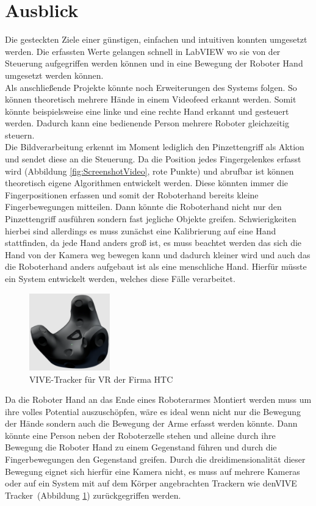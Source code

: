\documentclass[a4paper,12pt,final]{article} %
\numberwithin{equation}{section} %
\numberwithin{figure}{section} %
\numberwithin{table}{section} %
\begin{document}
\section{Ausblick}
Die gesteckten Ziele einer günstigen, einfachen und intuitiven konnten umgesetzt werden. 
Die erfassten Werte gelangen schnell in LabVIEW wo sie von der Steuerung aufgegriffen werden können und in eine Bewegung der Roboter Hand umgesetzt werden können.\\
Als anschließende Projekte könnte noch Erweiterungen des Systems folgen. So können theoretisch mehrere Hände in einem Videofeed erkannt werden.
Somit könnte beispielsweise eine linke und eine rechte Hand erkannt und gesteuert werden. Dadurch kann eine bedienende Person mehrere Roboter gleichzeitig steuern.\\ 
Die Bildverarbeitung erkennt im Moment lediglich den Pinzettengriff als Aktion und sendet diese an die Steuerung. Da die Position jedes Fingergelenkes erfasst wird (Abbildung \ref{fig:ScreenshotVideo}, rote Punkte) und abrufbar ist können theoretisch eigene Algorithmen entwickelt werden.
Diese könnten immer die Fingerpositionen erfassen und somit der Roboterhand bereits kleine Fingerbewegungen mitteilen. Dann könnte die Roboterhand nicht nur den Pinzettengriff ausführen sondern fast jegliche Objekte greifen.
Schwierigkeiten hierbei sind allerdings es muss zunächst eine Kalibrierung auf eine Hand stattfinden, da jede Hand anders groß ist, es muss beachtet werden das sich die Hand von der Kamera weg bewegen kann und dadurch kleiner wird und auch das die Roboterhand anders aufgebaut ist als eine menschliche Hand.
Hierfür müsste ein System entwickelt werden, welches diese Fälle verarbeitet.\\
\begin{figure}[H]
	\begin{center}
		\includegraphics[width=3.5cm]{Bilder/VIVE.png}
		\caption{VIVE-Tracker für VR der Firma HTC \cite{HTCvive}}
		\label{fig:VIVE}	
	\end{center}
\end{figure}
Da die Roboter Hand an das Ende eines Roboterarmes Montiert werden muss um ihre volles Potential auszuschöpfen, wäre es ideal wenn nicht nur die Bewegung der Hände sondern auch die Bewegung der Arme erfasst werden könnte.
Dann könnte eine Person neben der Roboterzelle stehen und alleine durch ihre Bewegung die Roboter Hand zu einem Gegenstand führen und durch die Fingerbewegungen den Gegenstand greifen.
Durch die dreidimensionalität dieser Bewegung eignet sich hierfür eine Kamera nicht, es muss auf mehrere Kameras oder auf ein System mit auf dem Körper angebrachten Trackern wie den\glqq VIVE Tracker\grqq\ (Abbildung \ref{fig:VIVE}) zurückgegriffen werden.
\newpage
{}
{} %
\printbibliography  %
\newpage
\end{document}
